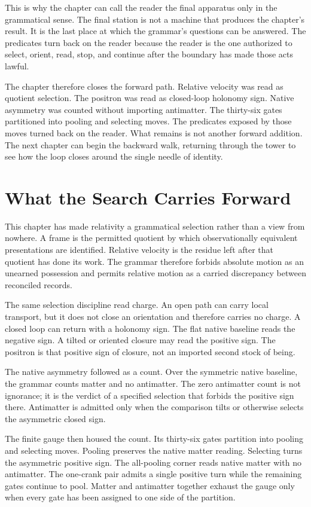 This is why the chapter can call the reader the final apparatus only in the
grammatical sense. The final station is not a machine that produces the
chapter's result. It is the last place at which the grammar's questions can be answered.
The predicates turn back on the reader because the reader is the one
authorized to select, orient, read, stop, and continue after the boundary has
made those acts lawful.

The chapter therefore closes the forward path. Relative velocity was read as
quotient selection. The positron was read as closed-loop holonomy sign.
Native asymmetry was counted without importing antimatter. The thirty-six
gates partitioned into pooling and selecting moves. The predicates exposed
by those moves turned back on the reader. What remains is not another
forward addition. The next chapter can begin the backward walk, returning
through the tower to see how the loop closes around the single needle of
identity.

\section{What the Search Carries Forward}

This chapter has made relativity a grammatical selection rather than a view
from nowhere. A frame is the permitted quotient by which observationally
equivalent presentations are identified. Relative velocity is the residue
left after that quotient has done its work. The grammar therefore forbids
absolute motion as an unearned possession and permits relative motion as a
carried discrepancy between reconciled records.

The same selection discipline read charge. An open path can carry local
transport, but it does not close an orientation and therefore carries no
charge. A closed loop can return with a holonomy sign. The flat native
baseline reads the negative sign. A tilted or oriented closure may read the
positive sign. The positron is that positive sign of closure, not an
imported second stock of being.

The native asymmetry followed as a count. Over the symmetric native
baseline, the grammar counts matter and no antimatter. The zero antimatter
count is not ignorance; it is the verdict of a specified selection that
forbids the positive sign there. Antimatter is admitted only when the
comparison tilts or otherwise selects the asymmetric closed sign.

The finite gauge then housed the count. Its thirty-six gates partition into
pooling and selecting moves. Pooling preserves the native matter reading.
Selecting turns the asymmetric positive sign. The all-pooling corner reads
native matter with no antimatter. The one-crank pair admits a single
positive turn while the remaining gates continue to pool. Matter and
antimatter together exhaust the gauge only when every gate has been assigned
to one side of the partition.

